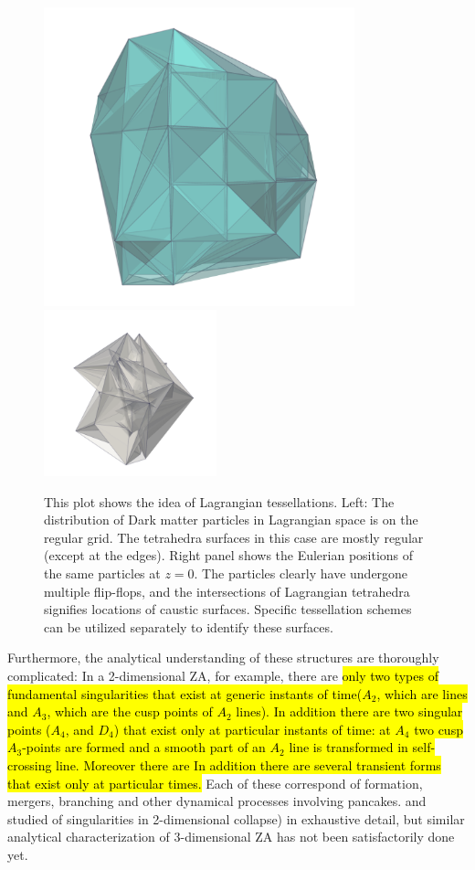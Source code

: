 \begin{figure} 
\centering\includegraphics[width=9cm]{Chapter2/Plots/qDel.png}
\centering\includegraphics[width=5cm]{Chapter2/Plots/x.png}
\caption{ This plot shows the idea of Lagrangian tessellations. Left: The distribution of Dark matter particles in Lagrangian space is on the regular grid. The tetrahedra surfaces in this case are mostly regular (except at the edges). Right panel shows the Eulerian positions of the same particles at $z=0$. The particles clearly have undergone multiple flip-flops, and the intersections of Lagrangian tetrahedra signifies locations of caustic surfaces. Specific tessellation schemes can be utilized separately to identify these surfaces. }
\label{fig:Tess}
\end{figure}


Furthermore, the analytical understanding of these structures are thoroughly complicated: In a 2-dimensional ZA, for example, there are 
\hl{only two types of fundamental singularities that exist at generic instants of time($A_2$, which are lines and $A_3$, which are the cusp points of $A_2$ lines).   In addition there are two singular points ($A_4$, and $D_4$) that exist  only at particular instants of time: at $A_4$ two cusp $A_3$-points are formed and a smooth part of an $A_2$ line is  transformed in self-crossing
line. Moreover there are  
 In addition there are several transient forms that exist only 
at particular times.}
Each of these correspond of formation, mergers, branching and other dynamical processes involving pancakes. \cite{Arnold1982} and \cite{Hidding2014} studied of singularities in 2-dimensional collapse) in exhaustive detail, but similar analytical characterization of 3-dimensional ZA has not been satisfactorily done yet.  
 
